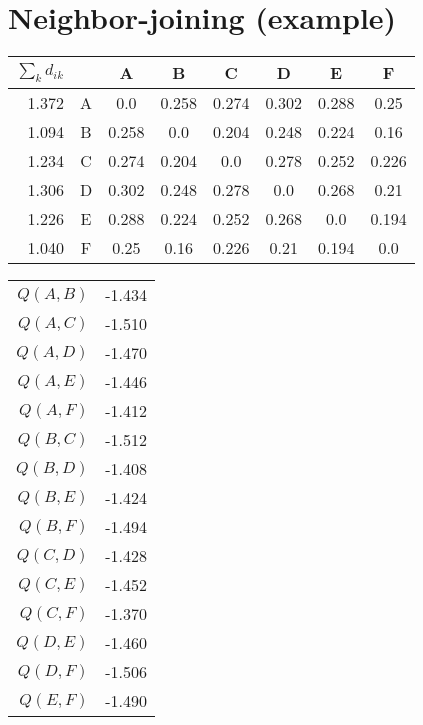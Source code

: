\documentclass[landscape]{foils}
\begin{document}
\section*{Neighbor-joining (example)}
\begin{table}[htdp]
\begin{center}
\begin{tabular}{|r|c|c|c|c|c|c|c|}
\hline
$\sum_{k} d_{ik}$ &  & A & B & C & D & E & F  \\ 
\hline
1.372 & A & 0.0 & 0.258 & 0.274 & 0.302 & 0.288 & 0.25 \\
1.094 & B & 0.258 & 0.0 & 0.204 & 0.248 & 0.224 & 0.16 \\
1.234 & C & 0.274 & 0.204 & 0.0 & 0.278 & 0.252 & 0.226 \\
1.306 & D & 0.302 & 0.248 & 0.278 & 0.0 & 0.268 & 0.21 \\
1.226 & E & 0.288 & 0.224 & 0.252 & 0.268 & 0.0 & 0.194 \\
1.040 & F & 0.25 & 0.16 & 0.226 & 0.21 & 0.194 & 0.0 \\
\hline
\end{tabular}
\end{center}
\end{table}%


\myNewSlide
\begin{table}[htdp]
\begin{center}
\begin{tabular}{|r|c|}
\hline
$Q(A,B)$ & -1.434 \\
$Q(A,C)$ & -1.510 \\
$Q(A,D)$ & -1.470 \\
$Q(A,E)$ & -1.446 \\
$Q(A,F)$ & -1.412 \\
{\color{red} $Q(B,C)$ } &{\color{red} -1.512 }\\
$Q(B,D)$ & -1.408 \\
$Q(B,E)$ & -1.424 \\
$Q(B,F)$ & -1.494 \\
$Q(C,D)$ & -1.428 \\
$Q(C,E)$ & -1.452 \\
$Q(C,F)$ & -1.370 \\
$Q(D,E)$ & -1.460 \\
$Q(D,F)$ & -1.506 \\
$Q(E,F)$ & -1.490 \\
\hline
\end{tabular}
\end{center}
\end{table}%
\end{document}

